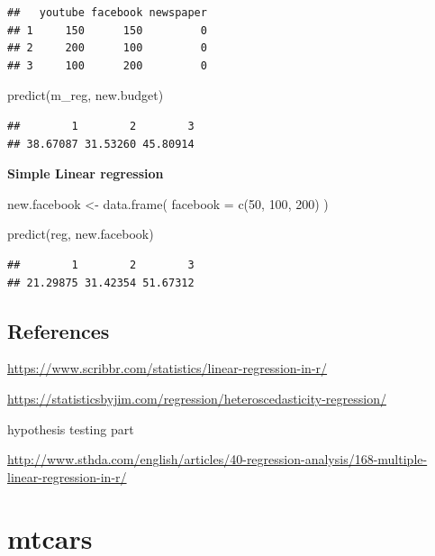 \documentclass[
]{book}
\newenvironment{Shaded}{\begin{snugshade}}{\end{snugshade}}
\newcommand{\AttributeTok}[1]{\textcolor[rgb]{0.77,0.63,0.00}{#1}}
\newcommand{\DecValTok}[1]{\textcolor[rgb]{0.00,0.00,0.81}{#1}}
\newcommand{\FunctionTok}[1]{\textcolor[rgb]{0.00,0.00,0.00}{#1}}
\newcommand{\NormalTok}[1]{#1}
\newcommand{\OtherTok}[1]{\textcolor[rgb]{0.56,0.35,0.01}{#1}}
\begin{document}
\begin{verbatim}
##   youtube facebook newspaper
## 1     150      150         0
## 2     200      100         0
## 3     100      200         0
\end{verbatim}

\begin{Shaded}
\begin{Highlighting}[]
\FunctionTok{predict}\NormalTok{(m\_reg, new.budget)}
\end{Highlighting}
\end{Shaded}

\begin{verbatim}
##        1        2        3 
## 38.67087 31.53260 45.80914
\end{verbatim}

\textbf{Simple Linear regression}

\begin{Shaded}
\begin{Highlighting}[]
\NormalTok{new.facebook }\OtherTok{\textless{}{-}} \FunctionTok{data.frame}\NormalTok{(}
  \AttributeTok{facebook =} \FunctionTok{c}\NormalTok{(}\DecValTok{50}\NormalTok{, }\DecValTok{100}\NormalTok{, }\DecValTok{200}\NormalTok{)}
\NormalTok{)}

\FunctionTok{predict}\NormalTok{(reg, new.facebook)}
\end{Highlighting}
\end{Shaded}

\begin{verbatim}
##        1        2        3 
## 21.29875 31.42354 51.67312
\end{verbatim}

\newpage

\hypertarget{references-1}{%
\section{References}\label{references-1}}

\url{https://www.scribbr.com/statistics/linear-regression-in-r/}

\url{https://statisticsbyjim.com/regression/heteroscedasticity-regression/}

\newpage

hypothesis testing part

\url{http://www.sthda.com/english/articles/40-regression-analysis/168-multiple-linear-regression-in-r/}

\hypertarget{mtcars}{%
\chapter{mtcars}\label{mtcars}}
\end{document}
